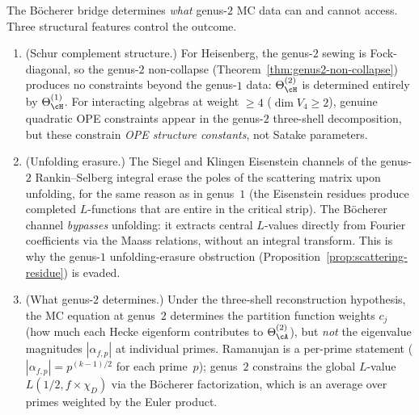 \begin{remark}%
\label{rem:genus2-definitive-scope}%
\ClaimStatusProvedHere%
%
%
%
The B\"ocherer bridge determines \emph{what} genus-$2$
MC data can and cannot access. Three structural features
control the outcome.

\begin{enumerate}[label=\textup{(\roman*)}]
\item \textup{(Schur complement structure.)}
For Heisenberg, the genus-$2$ sewing is Fock-diagonal,
so the genus-$2$ non-collapse
\textup{(}Theorem~\textup{\ref{thm:genus2-non-collapse}}\textup{)}
produces no constraints beyond the genus-$1$ data:
$\Theta_\cH^{(2)}$ is determined entirely by
$\Theta_\cH^{(1)}$.
For interacting algebras at weight $\geq 4$
\textup{(}$\dim V_4 \geq 2$\textup{)},
genuine quadratic OPE constraints appear in the
genus-$2$ three-shell decomposition, but these
constrain \emph{OPE structure constants}, not
Satake parameters.

\item \textup{(Unfolding erasure.)}
The Siegel and Klingen Eisenstein channels of the genus-$2$
Rankin--Selberg integral erase the poles of the scattering
matrix upon unfolding, for the same reason as in genus~$1$
\textup{(}the Eisenstein residues produce completed
$L$-functions that are entire in the critical strip\textup{)}.
The B\"ocherer channel \emph{bypasses} unfolding: it
extracts central $L$-values directly from Fourier
coefficients via the Maass
relations, without an integral transform. This is why the
genus-$1$ unfolding-erasure obstruction
\textup{(}Proposition~\textup{\ref{prop:scattering-residue}}\textup{)}
is evaded.

\item \textup{(What genus-$2$ determines.)}
Under the three-shell reconstruction hypothesis, the MC equation at
genus~$2$ determines the partition
function weights $c_j$ \textup{(}how much each
Hecke eigenform contributes to $\Theta_\cA^{(2)}$\textup{)},
but \emph{not} the eigenvalue magnitudes
$|\alpha_{f,p}|$ at individual primes.
Ramanujan is a per-prime statement
\textup{(}$|\alpha_{f,p}| = p^{(k-1)/2}$ for each prime~$p$\textup{)};
genus~$2$ constrains the global $L$-value
$L(1/2, f \times \chi_D)$ via the B\"ocherer
factorization, which is an average over primes weighted
by the Euler product.
\end{enumerate}
\end{remark}

